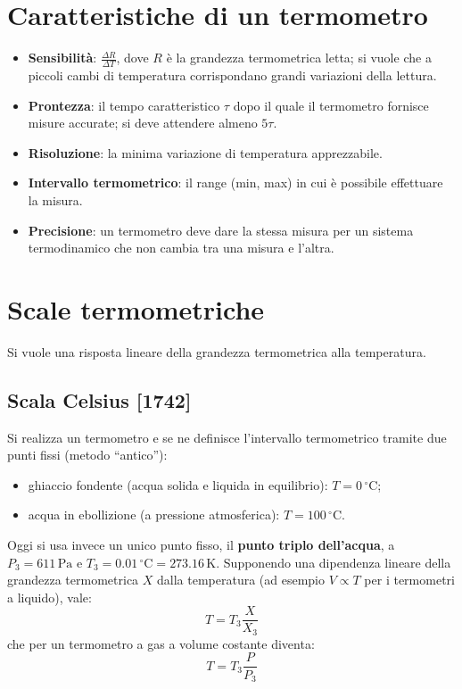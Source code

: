 \documentclass[11pt, a4paper, openright]{book}
\theoremstyle{plain}
\theoremstyle{definition}
\theoremstyle{remark}
\begin{document}
\section{Caratteristiche di un termometro}
\begin{itemize}
    \item \textbf{Sensibilità}: $\frac{\Delta R}{\Delta T}$, dove $R$ è la grandezza termometrica letta; si vuole che a piccoli cambi di temperatura corrispondano grandi variazioni della lettura.
    \item \textbf{Prontezza}: il tempo caratteristico $\tau$ dopo il quale il termometro fornisce misure accurate; si deve attendere almeno $5\tau$.
    \item \textbf{Risoluzione}: la minima variazione di temperatura apprezzabile.
    \item \textbf{Intervallo termometrico}: il range (min, max) in cui è possibile effettuare la misura.
    \item \textbf{Precisione}: un termometro deve dare la stessa misura per un sistema termodinamico che non cambia tra una misura e l'altra.
\end{itemize}

\section{Scale termometriche}
Si vuole una risposta lineare della grandezza termometrica alla temperatura.

\subsection{Scala Celsius [1742]}
Si realizza un termometro e se ne definisce l'intervallo termometrico tramite due punti fissi (metodo ``antico''):
\begin{itemize}
    \item ghiaccio fondente (acqua solida e liquida in equilibrio): $T = 0\,^\circ\text{C}$;
    \item acqua in ebollizione (a pressione atmosferica): $T = 100\,^\circ\text{C}$.
\end{itemize}
Oggi si usa invece un unico punto fisso, il \textbf{punto triplo dell'acqua}, a $P_3 = 611\,\text{Pa}$ e $T_3 = 0.01\,^\circ\text{C} = 273.16\,\text{K}$. Supponendo una dipendenza lineare della grandezza termometrica $X$ dalla temperatura (ad esempio $V \propto T$ per i termometri a liquido), vale:
\begin{equation}
    T = T_3 \frac{X}{X_3}
\end{equation}
che per un termometro a gas a volume costante diventa:
\begin{equation}
    T = T_3 \frac{P}{P_3}
\end{equation}
\end{document}
